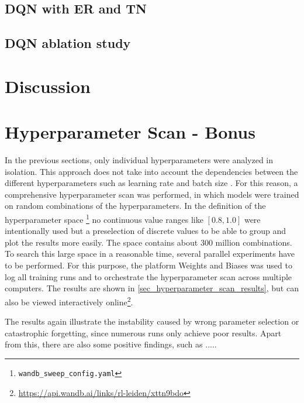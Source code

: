 \documentclass{article}
\begin{document}
\subsection{DQN with ER and TN}

\subsection{DQN ablation study}


\section{Discussion}
\label{sec_discussion}


\section{Hyperparameter Scan - Bonus}
\label{sec_bonus}
In the previous sections, only individual hyperparameters were analyzed in isolation. 
This approach does not take into account the dependencies between the different hyperparameters 
such as learning rate and batch size \cite{DBLP:conf/iclr/SmithKYL18}. 
For this reason, a comprehensive hyperparameter scan was performed, in which models were trained on random combinations of the hyperparameters. 
In the definition of the hyperparameter space \footnote{\texttt{wandb\_sweep\_config.yaml}} 
no continuous value ranges like $[0.8, 1.0]$ were intentionally used but a preselection of discrete values to be able to group and plot the results more easily. 
The space contains about 300 million combinations. 
To search this large space in a reasonable time, several parallel experiments have to be performed. 
For this purpose, the platform Weights and Biases \cite{wandb} was used to log all training runs and to orchestrate the hyperparameter scan across multiple computers. 
The results are shown in \autoref{sec_hyperparameter_scan_results}, 
but can also be viewed interactively online\footnote{\url{https://api.wandb.ai/links/rl-leiden/xttn9bdo}}. 

The results again illustrate the instability caused by wrong parameter selection or catastrophic forgetting, 
since numerous runs only achieve poor results.
Apart from this, there are also some positive findings, such as .....

\nocite{DBLP:books/sp/Plaat22}
\end{document}
